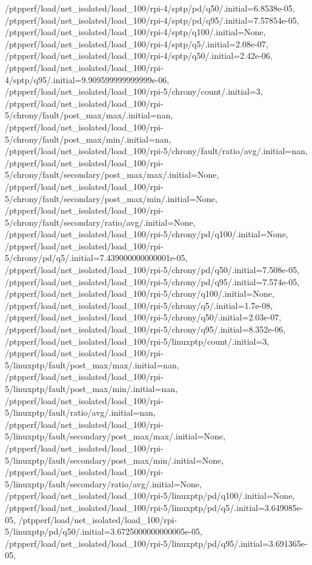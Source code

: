 {    /ptpperf/load/net_isolated/load_100/rpi-4/sptp/pd/q50/.initial=6.8538e-05,
    /ptpperf/load/net_isolated/load_100/rpi-4/sptp/pd/q95/.initial=7.57854e-05,
    /ptpperf/load/net_isolated/load_100/rpi-4/sptp/q100/.initial=None,
    /ptpperf/load/net_isolated/load_100/rpi-4/sptp/q5/.initial=2.08e-07,
    /ptpperf/load/net_isolated/load_100/rpi-4/sptp/q50/.initial=2.42e-06,
    /ptpperf/load/net_isolated/load_100/rpi-4/sptp/q95/.initial=9.909599999999999e-06,
    /ptpperf/load/net_isolated/load_100/rpi-5/chrony/count/.initial=3,
    /ptpperf/load/net_isolated/load_100/rpi-5/chrony/fault/post_max/max/.initial=nan,
    /ptpperf/load/net_isolated/load_100/rpi-5/chrony/fault/post_max/min/.initial=nan,
    /ptpperf/load/net_isolated/load_100/rpi-5/chrony/fault/ratio/avg/.initial=nan,
    /ptpperf/load/net_isolated/load_100/rpi-5/chrony/fault/secondary/post_max/max/.initial=None,
    /ptpperf/load/net_isolated/load_100/rpi-5/chrony/fault/secondary/post_max/min/.initial=None,
    /ptpperf/load/net_isolated/load_100/rpi-5/chrony/fault/secondary/ratio/avg/.initial=None,
    /ptpperf/load/net_isolated/load_100/rpi-5/chrony/pd/q100/.initial=None,
    /ptpperf/load/net_isolated/load_100/rpi-5/chrony/pd/q5/.initial=7.439000000000001e-05,
    /ptpperf/load/net_isolated/load_100/rpi-5/chrony/pd/q50/.initial=7.508e-05,
    /ptpperf/load/net_isolated/load_100/rpi-5/chrony/pd/q95/.initial=7.574e-05,
    /ptpperf/load/net_isolated/load_100/rpi-5/chrony/q100/.initial=None,
    /ptpperf/load/net_isolated/load_100/rpi-5/chrony/q5/.initial=1.7e-08,
    /ptpperf/load/net_isolated/load_100/rpi-5/chrony/q50/.initial=2.03e-07,
    /ptpperf/load/net_isolated/load_100/rpi-5/chrony/q95/.initial=8.352e-06,
    /ptpperf/load/net_isolated/load_100/rpi-5/linuxptp/count/.initial=3,
    /ptpperf/load/net_isolated/load_100/rpi-5/linuxptp/fault/post_max/max/.initial=nan,
    /ptpperf/load/net_isolated/load_100/rpi-5/linuxptp/fault/post_max/min/.initial=nan,
    /ptpperf/load/net_isolated/load_100/rpi-5/linuxptp/fault/ratio/avg/.initial=nan,
    /ptpperf/load/net_isolated/load_100/rpi-5/linuxptp/fault/secondary/post_max/max/.initial=None,
    /ptpperf/load/net_isolated/load_100/rpi-5/linuxptp/fault/secondary/post_max/min/.initial=None,
    /ptpperf/load/net_isolated/load_100/rpi-5/linuxptp/fault/secondary/ratio/avg/.initial=None,
    /ptpperf/load/net_isolated/load_100/rpi-5/linuxptp/pd/q100/.initial=None,
    /ptpperf/load/net_isolated/load_100/rpi-5/linuxptp/pd/q5/.initial=3.649085e-05,
    /ptpperf/load/net_isolated/load_100/rpi-5/linuxptp/pd/q50/.initial=3.6725000000000005e-05,
    /ptpperf/load/net_isolated/load_100/rpi-5/linuxptp/pd/q95/.initial=3.691365e-05,
}
